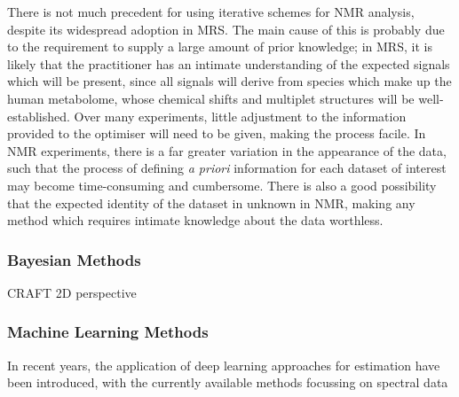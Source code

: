 There is not much precedent for using iterative schemes for \ac{NMR} analysis,
despite its widespread adoption in \ac{MRS}. The main cause of this is probably due to
the requirement to supply a large amount of prior knowledge; in \ac{MRS}, it
is likely that the practitioner has an intimate understanding of the expected signals
which will be present, since all signals will derive from species
which make up the human metabolome, whose chemical shifts and multiplet
structures will be well-established. Over many experiments, little adjustment
to the information provided to the optimiser will need to be given, making the
process facile. In \ac{NMR} experiments, there is a far greater variation in
the appearance of the data, such that the process of defining \textit{a priori}
information for each dataset of interest may become time-consuming and
cumbersome. There is also a good possibility that the expected identity of the
dataset in unknown in \ac{NMR}, making any method which requires intimate
knowledge about the data worthless.

\subsubsection{Bayesian Methods}
\ac{CRAFT}\cite{Krishnamurthy2013}
2D\cite{Krishnamurthy2017}
perspective\cite{Krishnamurthy2021}

\subsubsection{Machine Learning Methods}
In recent years, the application of deep learning approaches for estimation have been
introduced, with the currently available methods focussing on spectral
data\cite{Li2021,Schmid2023}
